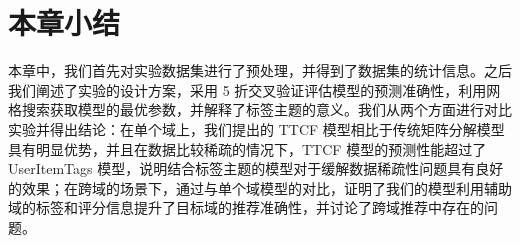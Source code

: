 \section{本章小结}
本章中，我们首先对实验数据集进行了预处理，并得到了数据集的统计信息。之后我们阐述了实验的设计方案，采用 5 折交叉验证评估模型的预测准确性，利用网格搜索获取模型的最优参数，并解释了标签主题的意义。我们从两个方面进行对比实验并得出结论：在单个域上，我们提出的 TTCF 模型相比于传统矩阵分解模型具有明显优势，并且在数据比较稀疏的情况下，TTCF 模型的预测性能超过了 UserItemTags 模型，说明结合标签主题的模型对于缓解数据稀疏性问题具有良好的效果；在跨域的场景下，通过与单个域模型的对比，证明了我们的模型利用辅助域的标签和评分信息提升了目标域的推荐准确性，并讨论了跨域推荐中存在的问题。


